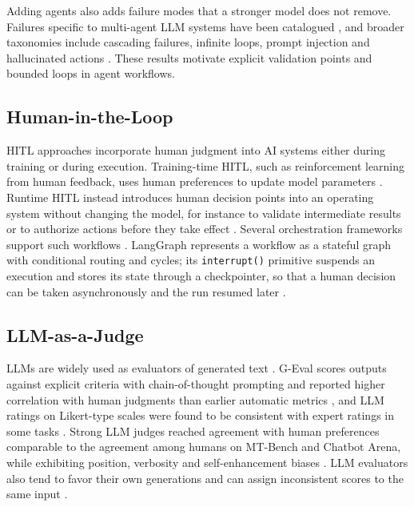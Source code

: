 \documentclass[a4paper,twoside]{article}
\begin{document}
Adding agents also adds failure modes that a stronger model does not remove. Failures specific to multi-agent LLM systems have been catalogued \cite{cemri2025why}, and broader taxonomies include cascading failures, infinite loops, prompt injection and hallucinated actions \cite{arunkumar2026agentic}. These results motivate explicit validation points and bounded loops in agent workflows.

\subsection{Human-in-the-Loop}

HITL approaches incorporate human judgment into AI systems either during training or during execution. Training-time HITL, such as reinforcement learning from human feedback, uses human preferences to update model parameters \cite{ouyang2022training}. Runtime HITL instead introduces human decision points into an operating system without changing the model, for instance to validate intermediate results or to authorize actions before they take effect \cite{moraes2026integrating}. Several orchestration frameworks support such workflows \cite{abrantes2026scoping}. LangGraph represents a workflow as a stateful graph with conditional routing and cycles; its \texttt{interrupt()} primitive suspends an execution and stores its state through a checkpointer, so that a human decision can be taken asynchronously and the run resumed later \cite{langgraph}.

\subsection{LLM-as-a-Judge}

LLMs are widely used as evaluators of generated text \cite{gu2026survey}. G-Eval scores outputs against explicit criteria with chain-of-thought prompting and reported higher correlation with human judgments than earlier automatic metrics \cite{liu2023geval}, and LLM ratings on Likert-type scales were found to be consistent with expert ratings in some tasks \cite{chiang2023can}. Strong LLM judges reached agreement with human preferences comparable to the agreement among humans on MT-Bench and Chatbot Arena, while exhibiting position, verbosity and self-enhancement biases \cite{zheng2023judging}. LLM evaluators also tend to favor their own generations \cite{panickssery2024llm} and can assign inconsistent scores to the same input \cite{stureborg2024inconsistent}.
\end{document}
